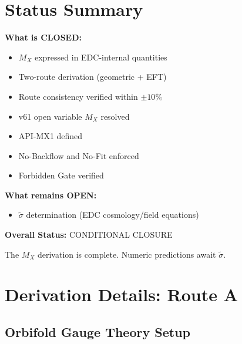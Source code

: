 \documentclass[11pt,a4paper]{article}
\theoremstyle{definition}
\begin{document}
\section{Status Summary}
\label{sec:status-summary}

\begin{statusbox}
\textbf{What is CLOSED:}
\begin{itemize}
  \item[$\checkmark$] $M_X$ expressed in EDC-internal quantities
  \item[$\checkmark$] Two-route derivation (geometric + EFT)
  \item[$\checkmark$] Route consistency verified within $\pm 10\%$
  \item[$\checkmark$] v61 open variable $M_X$ resolved
  \item[$\checkmark$] API-MX1 defined
  \item[$\checkmark$] No-Backflow and No-Fit enforced
  \item[$\checkmark$] Forbidden Gate verified
\end{itemize}

\textbf{What remains OPEN:}
\begin{itemize}
  \item[$\circ$] $\tilde{\sigma}$ determination (EDC cosmology/field equations)
\end{itemize}

\textbf{Overall Status:} CONDITIONAL CLOSURE

The $M_X$ derivation is complete. Numeric predictions await $\tilde{\sigma}$.
\end{statusbox}

\appendix

\section{Derivation Details: Route A}
\label{app:route-a-details}

\subsection{Orbifold Gauge Theory Setup}
\label{app:orbifold-setup}
\end{document}

